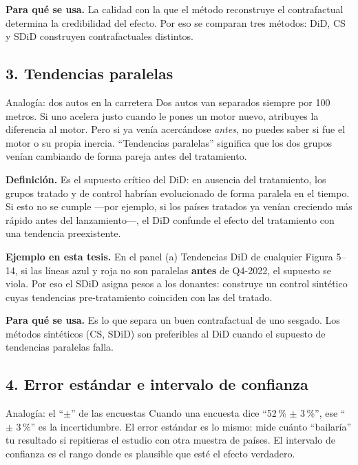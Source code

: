 \documentclass[11pt,a4paper]{article}
\begin{document}
\textbf{Para qué se usa.} La calidad con la que el método reconstruye el contrafactual determina la credibilidad del efecto. Por eso se comparan tres métodos: DiD, CS y SDiD construyen contrafactuales distintos.

\subsection*{3. Tendencias paralelas}

\begin{ideabox}{Analogía: dos autos en la carretera}
Dos autos van separados siempre por 100 metros. Si uno acelera justo cuando le pones un motor nuevo, atribuyes la diferencia al motor. Pero si ya venía acercándose \emph{antes}, no puedes saber si fue el motor o su propia inercia. ``Tendencias paralelas'' significa que los dos grupos venían cambiando de forma pareja antes del tratamiento.
\end{ideabox}

\textbf{Definición.} Es el supuesto crítico del DiD: en ausencia del tratamiento, los grupos tratado y de control habrían evolucionado de forma paralela en el tiempo. Si esto no se cumple ---por ejemplo, si los países tratados ya venían creciendo más rápido antes del lanzamiento---, el DiD confunde el efecto del tratamiento con una tendencia preexistente.

\textbf{Ejemplo en esta tesis.} En el panel (a) Tendencias DiD de cualquier Figura 5--14, si las líneas azul y roja no son paralelas \textbf{antes} de Q4-2022, el supuesto se viola. Por eso el SDiD asigna pesos a los donantes: construye un control sintético cuyas tendencias pre-tratamiento coinciden con las del tratado.

\textbf{Para qué se usa.} Es lo que separa un buen contrafactual de uno sesgado. Los métodos sintéticos (CS, SDiD) son preferibles al DiD cuando el supuesto de tendencias paralelas falla.

\subsection*{4. Error estándar e intervalo de confianza}

\begin{ideabox}{Analogía: el ``$\pm$'' de las encuestas}
Cuando una encuesta dice ``52\,\% $\pm$ 3\,\%'', ese ``$\pm$ 3\,\%'' es la incertidumbre. El error estándar es lo mismo: mide cuánto ``bailaría'' tu resultado si repitieras el estudio con otra muestra de países. El intervalo de confianza es el rango donde es plausible que esté el efecto verdadero.
\end{ideabox}
\end{document}
